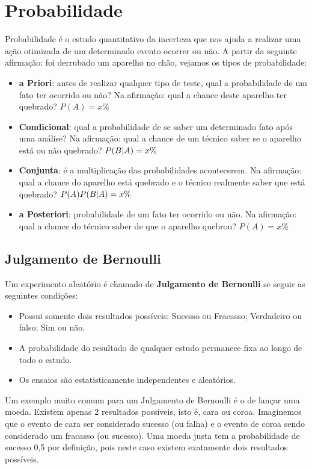 \documentclass[a4paper,11pt]{article}
\begin{document}
\section{Probabilidade}
Probabilidade é o estudo quantitativo da incerteza que nos ajuda a realizar uma ação otimizada de um determinado evento ocorrer ou não. A partir da seguinte afirmação: foi derrubado um aparelho no chão, vejamos os tipos de probabilidade: \vspace{-1em}
\begin{itemize}
	\item \textbf{a Priori}: antes de realizar qualquer tipo de teste, qual a probabilidade de um fato ter ocorrido ou não? Na afirmação: qual a chance deste aparelho ter quebrado? $P(A) = x\%$
	\item \textbf{Condicional}: qual a probabilidade de se saber um determinado fato após uma análise? Na afirmação: qual a chance de um técnico saber se o aparelho está ou não quebrado? $P(B \arrowvert A) = x\%$
	\item \textbf{Conjunta}: é a multiplicação das probabilidades acontecerem. Na afirmação: qual a chance do aparelho está quebrado e o técnico realmente saber que está quebrado? $P(A)P(B \arrowvert A) = x\%$  
	\item \textbf{a Posteriori}: probabilidade de um fato ter ocorrido ou não. Na afirmação: qual a chance do técnico saber de que o aparelho quebrou? $P(A) = x\%$
\end{itemize}

\subsection{Julgamento de Bernoulli}
Um experimento aleatório é chamado de \textbf{Julgamento de Bernoulli} se seguir as seguintes condições: \vspace{-1em}
\begin{itemize}
	\item Possui somente dois resultados possíveis: Sucesso ou Fracasso; Verdadeiro ou falso; Sim ou não.
	\item A probabilidade do resultado de qualquer estudo permanece fixa ao longo de todo o estudo.
	\item Os ensaios são estatisticamente independentes e aleatórios.
\end{itemize}

Um exemplo muito comum para um Julgamento de Bernoulli é o de lançar uma moeda. Existem apenas 2 resultados possíveis, isto é, cara ou coroa. Imaginemos que o evento de cara ser considerado sucesso (ou falha) e o evento de coroa sendo considerado um fracasso (ou sucesso). Uma moeda justa tem a probabilidade de sucesso 0,5 por definição, pois neste caso existem exatamente dois resultados possíveis.
\end{document}
